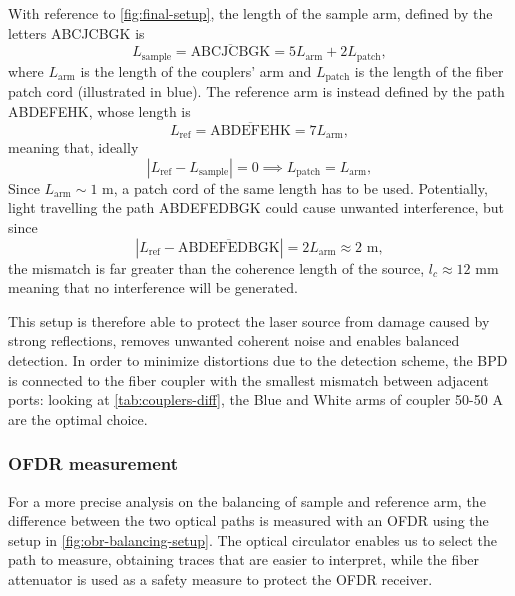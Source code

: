 With reference to \autoref{fig:final-setup}, the length of the sample arm, defined by the letters ABCJCBGK is
\begin{equation}
L_{\text{sample}} = \overline{\text{ABCJCBGK}} = 5L_{\text{arm}} + 2L_{\text{patch}},
\end{equation}
where $L_{\text{arm}}$ is the length of the couplers' arm and $L_{\text{patch}}$ is the length of the fiber patch cord (illustrated in blue). The reference arm is instead defined by the path ABDEFEHK, whose length is
\begin{equation}
	L_{\text{ref}} = \overline{\text{ABDEFEHK}} = 7L_{\text{arm}},
\end{equation}
meaning that, ideally
\begin{equation}
	| L_{\text{ref}} - L_{\text{sample}}| = 0 \implies L_{\text{patch}} = L_{\text{arm}},
\end{equation}
Since $L_{\text{arm}} \sim 1$ m, a patch cord of the same length has to be used. Potentially, light travelling the path ABDEFEDBGK could cause unwanted interference, but since
\begin{equation}
| L_{\text{ref}} - \overline{\text{ABDEFEDBGK}}| = 2L_{\text{arm}} \approx 2 \text{ m},
\end{equation}
the mismatch is far greater than the coherence length of the source, $l_c \approx 12$ mm meaning that no interference will be generated. 

This setup is therefore able to protect the laser source from damage caused by strong reflections, removes unwanted coherent noise and enables balanced detection. In order to minimize distortions due to the detection scheme, the BPD is connected to the fiber coupler with the smallest mismatch between adjacent ports: looking at \autoref{tab:couplers-diff}, the Blue and White arms of coupler 50-50 A are the optimal choice. 

\subsubsection{OFDR measurement}

For a more precise analysis on the balancing of sample and reference arm, the difference between the two optical paths is measured with an OFDR using the setup in \autoref{fig:obr-balancing-setup}. The optical circulator enables us to select the path to measure, obtaining traces that are easier to interpret, while the fiber attenuator is used as a safety measure to protect the OFDR receiver. 

